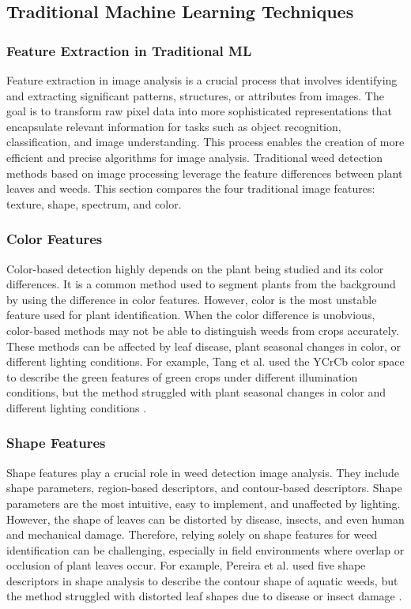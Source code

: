 \documentclass[10pt,twocolumn,letterpaper]{article}
\begin{document}
\subsection{Traditional Machine Learning Techniques}

\subsubsection{Feature Extraction in Traditional ML}
Feature extraction in image analysis is a crucial process that involves identifying and extracting significant patterns, structures, or attributes from images. The goal is to transform raw pixel data into more sophisticated representations that encapsulate relevant information for tasks such as object recognition, classification, and image understanding. This process enables the creation of more efficient and precise algorithms for image analysis. Traditional weed detection methods based on image processing leverage the feature differences between plant leaves and weeds. This section compares the four traditional image features: texture, shape, spectrum, and color.

\subsubsection{Color Features}
Color-based detection highly depends on the plant being studied and its color differences. It is a common method used to segment plants from the background by using the difference in color features. However, color is the most unstable feature used for plant identification. When the color difference is unobvious, color-based methods may not be able to distinguish weeds from crops accurately. These methods can be affected by leaf disease, plant seasonal changes in color, or different lighting conditions. For example, Tang et al. used the YCrCb color space to describe the green features of green crops under different illumination conditions, but the method struggled with plant seasonal changes in color and different lighting conditions \cite{Tang}.

\subsubsection{Shape Features}
Shape features play a crucial role in weed detection image analysis. They include shape parameters, region-based descriptors, and contour-based descriptors. Shape parameters are the most intuitive, easy to implement, and unaffected by lighting. However, the shape of leaves can be distorted by disease, insects, and even human and mechanical damage. Therefore, relying solely on shape features for weed identification can be challenging, especially in field environments where overlap or occlusion of plant leaves occur. For example, Pereira et al. used five shape descriptors in shape analysis to describe the contour shape of aquatic weeds, but the method struggled with distorted leaf shapes due to disease or insect damage \cite{Pereira}.
\end{document}

